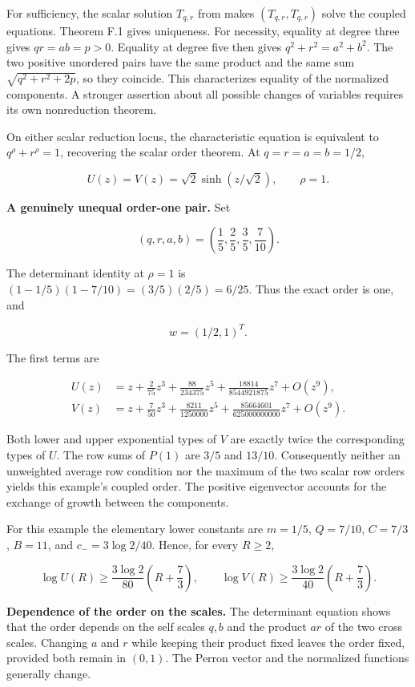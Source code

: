 For sufficiency, the scalar solution \(T_{q,r}\) from
 makes \((T_{q,r},T_{q,r})\)
solve the coupled equations. Theorem F.1 gives uniqueness. For necessity,
equality at degree three gives \(qr=ab=p>0\). Equality at degree five
then gives \(q^2+r^2=a^2+b^2\). The two positive unordered pairs have
the same product and the same sum \(\sqrt{q^2+r^2+2p}\), so they
coincide. This characterizes equality of the normalized components. A
stronger assertion about all possible changes of variables requires its
own nonreduction theorem.

On either scalar reduction locus, the characteristic equation is
equivalent to \(q^\rho+r^\rho=1\), recovering the scalar order theorem.
At \(q=r=a=b=1/2\),

\[
U(z)=V(z)=\sqrt2\sinh(z/\sqrt2),\qquad \rho=1.
\]

\textbf{A genuinely unequal order-one pair.} Set

\[
(q,r,a,b)=\left(\frac15,\frac25,\frac35,\frac7{10}\right).
\]

The determinant identity at \(\rho=1\) is
\((1-1/5)(1-7/10)=(3/5)(2/5)=6/25\). Thus the exact order is one, and

\[
w=(1/2,1)^T.
\]

The first terms are

\[
\begin{aligned}
U(z)&=z+\frac2{75}z^3+\frac{88}{234375}z^5
 +\frac{18814}{8544921875}z^7+O(z^9),\\
V(z)&=z+\frac7{50}z^3+\frac{8211}{1250000}z^5
 +\frac{85664601}{625000000000}z^7+O(z^9).
\end{aligned}
\]

Both lower and upper exponential types of \(V\) are exactly twice the
corresponding types of \(U\). The row sums of \(P(1)\) are \(3/5\) and
\(13/10\). Consequently neither an unweighted average row condition nor
the maximum of the two scalar row orders yields this example's coupled
order. The positive eigenvector accounts for the exchange of growth
between the components.

For this example the elementary lower constants are \(m=1/5\),
\(Q=7/10\), \(C=7/3\), \(B=11\), and \(c_-=3\log2/40\). Hence, for every
\(R\ge2\),

\[
\log U(R)\ge\frac{3\log2}{80}\left(R+\frac73\right),\qquad
\log V(R)\ge\frac{3\log2}{40}\left(R+\frac73\right).
\]

\textbf{Dependence of the order on the scales.} The determinant equation
shows that the order depends on the self scales \(q,b\) and the product
\(ar\) of the two cross scales. Changing \(a\) and \(r\) while keeping
their product fixed leaves the order fixed, provided both remain in
\((0,1)\). The Perron vector and the normalized functions generally
change.

